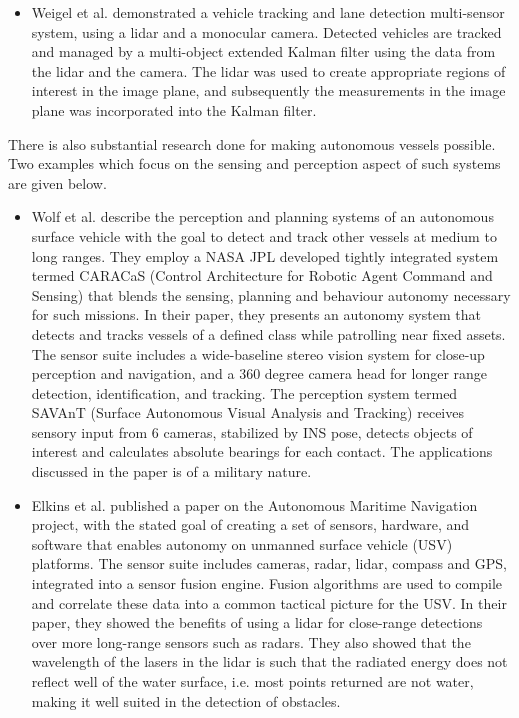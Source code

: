 \begin{itemize}
	\item Weigel et al. \cite{weigel_vehicle_tracking} demonstrated a vehicle tracking and lane detection multi-sensor system, using a lidar and a monocular camera. Detected vehicles are tracked and managed by a multi-object extended Kalman filter using the data from the lidar and the camera. The lidar was used to create appropriate regions of interest in the image plane, and subsequently the measurements in the image plane was incorporated into the Kalman filter.
\end{itemize}

There is also substantial research done for making autonomous vessels possible. Two examples which focus on the sensing and perception aspect of such systems are given below.
\begin{itemize}
	\item Wolf et al. \cite{ROB:ROB20371} describe the perception and planning systems of an autonomous surface vehicle with the goal to detect and track other vessels at medium to long ranges. They employ a NASA JPL developed tightly integrated system termed CARACaS (Control Architecture for Robotic Agent Command and Sensing) that blends the sensing, planning and behaviour autonomy necessary for such missions. In their paper, they presents an autonomy system that detects and tracks vessels of a defined class while patrolling near fixed assets. The sensor suite includes a wide-baseline stereo vision system for close-up perception and navigation, and a 360 degree camera head for longer range detection, identification, and tracking. The perception system termed SAVAnT (Surface Autonomous Visual Analysis and Tracking) receives sensory input from 6 cameras, stabilized by INS pose, detects objects of interest and calculates absolute bearings for each contact. The applications discussed in the paper is of a military nature.
	\item Elkins et al. \cite{ROB:ROB20367} published a paper on the Autonomous Maritime Navigation project, with the stated goal of creating a set of sensors, hardware, and software that enables autonomy on unmanned surface vehicle (USV) platforms. The sensor suite includes cameras, radar, lidar, compass and GPS, integrated into a sensor fusion engine. Fusion algorithms are used to compile and correlate these data into a common tactical picture for the USV. In their paper, they showed the benefits of using a lidar for close-range detections over more long-range sensors such as radars. They also showed that the wavelength of the lasers in the lidar is such that the radiated energy does not reflect well of the water surface, i.e. most points returned are not water, making it well suited in the detection of obstacles.
\end{itemize} 

